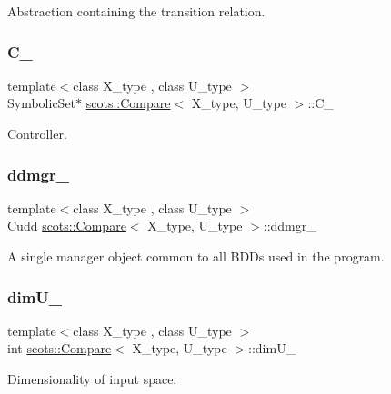 Abstraction containing the transition relation. \mbox{\label{classscots_1_1Compare_a1ffd2853abc9ab09cfb8983b3664ab1b}} 
\subsubsection{\texorpdfstring{C\+\_\+}{C\_}}
{\footnotesize\ttfamily template$<$class X\+\_\+type , class U\+\_\+type $>$ \\
Symbolic\+Set$\ast$ \hyperlink{classscots_1_1Compare}{scots\+::\+Compare}$<$ X\+\_\+type, U\+\_\+type $>$\+::C\+\_\+}

Controller. \mbox{\label{classscots_1_1Compare_a330d650aa232026ba22f43aa81974af9}} 
\subsubsection{\texorpdfstring{ddmgr\+\_\+}{ddmgr\_}}
{\footnotesize\ttfamily template$<$class X\+\_\+type , class U\+\_\+type $>$ \\
Cudd \hyperlink{classscots_1_1Compare}{scots\+::\+Compare}$<$ X\+\_\+type, U\+\_\+type $>$\+::ddmgr\+\_\+}

A single manager object common to all B\+D\+Ds used in the program. \mbox{\label{classscots_1_1Compare_a4bcfca4afdbb0cc4d0d656702e9f2498}} 
\subsubsection{\texorpdfstring{dim\+U\+\_\+}{dimU\_}}
{\footnotesize\ttfamily template$<$class X\+\_\+type , class U\+\_\+type $>$ \\
int \hyperlink{classscots_1_1Compare}{scots\+::\+Compare}$<$ X\+\_\+type, U\+\_\+type $>$\+::dim\+U\+\_\+}

Dimensionality of input space. \mbox{\label{classscots_1_1Compare_a5ca0b67f243d75684e573bdf39750298}} 
